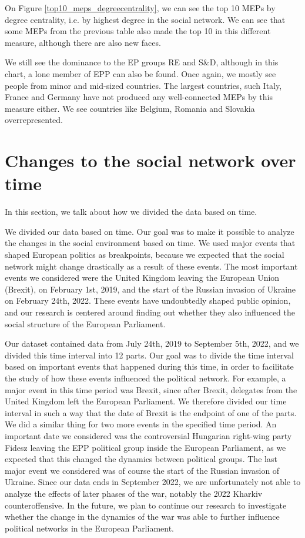 \documentclass[lettersize,journal]{IEEEtran}
\begin{document}
On Figure \ref{top10_meps_degreecentrality}, we can see the top 10 MEPs by degree centrality, i.e. by highest degree in the social network. We can see that some MEPs from the previous table also made the top 10 in this different measure, although there are also new faces.

We still see the dominance to the EP groups RE and S\&D, although in this chart, a lone member of EPP can also be found. Once again, we mostly see people from minor and mid-sized countries. The largest countries, such Italy, France and Germany have not produced any well-connected MEPs by this measure either. We see countries like Belgium, Romania and Slovakia overrepresented.

\section{Changes to the social network over time} \label{sec:overtime_anal}

In this section, we talk about how we divided the data based on time.

We divided our data based on time. Our goal was to make it possible to analyze the changes in the social environment based on time. We used major events that shaped European politics as breakpoints, because we expected that the social network might change drastically as a result of these events. The most important events we considered were the United Kingdom leaving the European Union (Brexit), on February 1st, 2019, and the start of the Russian invasion of Ukraine on February 24th, 2022. These events have undoubtedly shaped public opinion, and our research is centered around finding out whether they also influenced the social structure of the European Parliament.

Our dataset contained data from July 24th, 2019 to September 5th, 2022, and we divided this time interval into 12 parts. Our goal was to divide the time interval based on important events that happened during this time, in order to facilitate the study of how these events influenced the political network. For example, a major event in this time period was Brexit, since after Brexit, delegates from the United Kingdom left the European Parliament. We therefore divided our time interval in such a way that the date of Brexit is the endpoint of one of the parts. We did a similar thing for two more events in the specified time period. An important date we considered was the controversial Hungarian right-wing party Fidesz leaving the EPP political group inside the European Parliament, as we expected that this changed the dynamics between political groups. The last major event we considered was of course the start of the Russian invasion of Ukraine. Since our data ends in September 2022, we are unfortunately not able to analyze the effects of later phases of the war, notably the 2022 Kharkiv counteroffensive. In the future, we plan to continue our research to investigate whether the change in the dynamics of the war was able to further influence political networks in the European Parliament.
\end{document}
